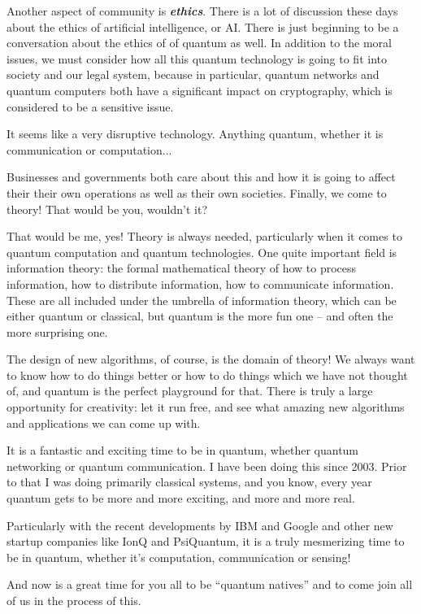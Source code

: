 Another aspect of community is \textbf{\emph{ethics}}. There is a lot of discussion these days about the ethics of artificial intelligence, or AI. There is just beginning to be a conversation about the ethics of of quantum as well. In addition to the moral issues, we must consider how all this quantum technology is going to fit into society and our legal system, because in particular, quantum networks and quantum computers both have a significant impact on cryptography, which is considered to be a sensitive issue.

\mmm It seems like a very disruptive technology.  Anything quantum, whether it is communication or computation...

\rrr Businesses and governments both care about this and how it is going to affect their their own operations as well as their own societies.
Finally, we come to theory! That would be you, wouldn't it?

\mmm That would be me, yes! Theory is always needed, particularly when it comes to quantum computation and quantum technologies. One quite important field is information theory: the formal mathematical theory of how to process information, how to distribute information, how to communicate information. These are all included under the umbrella of information theory, which can be either quantum or classical, but quantum is the more fun one -- and often the more surprising one.

The design of new algorithms, of course, is the domain of theory! We always want to know how to do things better or how to do things which we have not thought of, and quantum is the perfect playground for that. There is truly a large opportunity for creativity: let it run free, and see what amazing new algorithms and applications we can come up with.

\rrr It is a fantastic and exciting time to be in quantum, whether quantum networking or quantum communication. I have been doing this since 2003. Prior to that I was doing primarily classical systems, and you know, every year quantum gets to be more and more exciting, and more and more real.

\mmm Particularly with the recent developments by IBM and Google and other new startup companies like IonQ and PsiQuantum, it is a truly mesmerizing time to be in quantum, whether it's computation, communication or sensing!

\rrr And now is a great time for you all to be ``quantum natives'' and to come join all of us in the process of this.

